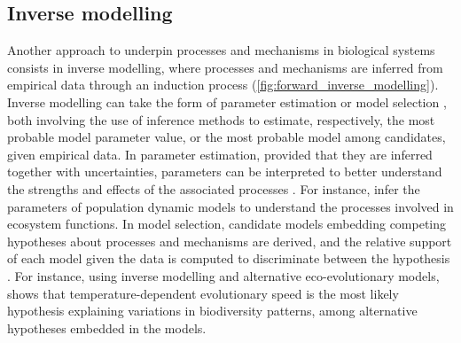 \subsection{Inverse modelling}
Another approach to underpin processes and mechanisms in biological systems consists in inverse modelling, where processes and mechanisms are inferred from empirical data through an induction process (\cref{fig:forward_inverse_modelling}).
% 
% 
% 
Inverse modelling can take the form of parameter estimation \citep{Schartau2017} or model selection \citep{Johnson2004}, both involving the use of inference methods to estimate, respectively, the most probable model parameter value, or the most probable model among candidates, given empirical data.
% 
% 
% 
% 
In parameter estimation, provided that they are inferred together with uncertainties, parameters can be interpreted to better understand the strengths and effects of the associated processes \citep{Pontarp2019}. For instance, \cite{Higgins2010,Curtsdotter2019} infer the parameters of population dynamic models to understand the processes involved in ecosystem functions.
%
In model selection, candidate models embedding competing hypotheses about processes and mechanisms are derived, and the relative support of each model given the data is computed to discriminate between the hypothesis \citep{Johnson2004}. For instance, using inverse modelling and alternative eco-evolutionary models, \citep{Skeels2022} shows that temperature-dependent evolutionary speed is the most likely hypothesis explaining variations in biodiversity patterns, among alternative hypotheses embedded in the models.


